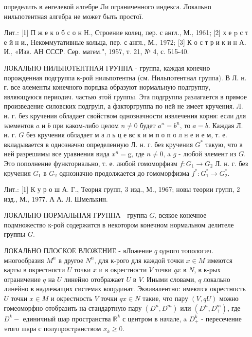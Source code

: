 \documentclass[10pt]{article}
\begin{document}
определить в әнгелевой алгебре Ли ограниченного индекса. Локально нильпотентная алгебра не может быть простої.



Лит.: [1] П ж е к о б с о н Н., Строение колец, пер. с англ., М., 1961; [2] х е p с т е й н и., Некоммутативные кольца, пер. с англ., М., 1972; [3] К о с т р и к и н А. И., «Изв. АН СССР. Сер. матем.", 1957, т. 21, № 4, с. 515-40.



ЛОКАЛЬНО НИЛЬПОТЕНТНАЯ ГРУППА - группа, каждая конечно порожденная подгруппа к-рой нильпотентна (см. Нильпотентнал группа). В Л. н. г. все әлементы конечного порядка образуют нормальную подгруппу, являющуюся периодич. частью этой группы. Эта подгруппа разлагается в прямое произведение силовских подгруіп, а факторгруппа по ней не имеет кручения. Л. н. г. без кручения обладает свойством однозначности извлечения корня: если для элементов $a$ и $b$ при каком-либо целом $n \neq 0$ будет $a^{n}=b^{n}$, то $a=b$. Каждая Л. н. г. $G$ без кручения обладает м а л ь ц е вс к и м п о п о л н е и е м, т. е. вкладывается в однозначно определенную Л. н. г. без кручения $G^{*}$ такую, что в ней разрешимы все уравнения вида $x^{n}=\mathrm{g}$, где $n \neq 0$, a $g$ - любой элемент из $G$. Это пополнение функториально, т. е. любой гомоморфизм $f: G_{1} \rightarrow G_{2}$ Л. н. г. без кручения $G_{1}$ в $G_{2}$ однозначно продолжается до гомоморфизма $f^{*}: G_{1}^{*} \rightarrow G_{2}^{*}$.



Лит.: [1] К у р о ш А. Г., Теория групп, 3 изд., М., 1967; новы теории групп, 2 изд., М., 1977. А А. Л. Шмелькин.



ЛОКАЛЬНО НОРМАЛЬНАЯ ГРУППА - группа $G$, всякое конечное подмножество к-рой содержится в некотором конечном нормальном делителе группы $G$.



ЛОКАЛЬНО ПЛОСКОЕ ВЛОЖЕНИЕ - вЛожение $q$ одного топологич. многообразия $M^{n}$ в другое $N^{n}$, для к-рого для каждой точки $x \in M$ имеются карты в окрестности $U$ точки $x$ и в окрестности $V$ точки $q x$ в $N$, в к-рых ограничение $q$ на $U$ линейно отображает $U$ в $V$. Иными словами, $q$ локально линейно в надлежащих системах координат. Эквивалентно: имеются окрестность $U$ точки $x \in M$ и окрестность $V$ точки $q x \in N$ такие, что пару $(V, q U)$ можно гомеоморфно отобразить на стандартную пару $\left(D^{n}, D^{m}\right)$ или $\left(D^{n}, D_{+}^{m}\right)$, где $D^{k}-$ единичный шар пространства $\mathbb{R}^{k}$ с центром в начале, a $D_{+}^{k}$ - пересечение этого шара с полупространством $x_{k} \geqslant 0$.
\end{document}
